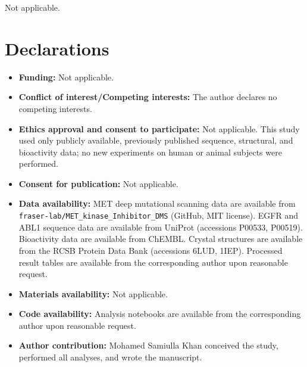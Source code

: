 \documentclass[pdflatex,sn-mathphys-num]{sn-jnl}%
\theoremstyle{thmstyleone}%
\theoremstyle{thmstyletwo}%
\theoremstyle{thmstylethree}%
\begin{document}
\backmatter

Not applicable.

\section*{Declarations}

\begin{itemize}
\item \textbf{Funding:} Not applicable.
\item \textbf{Conflict of interest/Competing interests:} The author declares no competing interests.
\item \textbf{Ethics approval and consent to participate:} Not applicable. This study used only publicly available, previously published sequence, structural, and bioactivity data; no new experiments on human or animal subjects were performed.
\item \textbf{Consent for publication:} Not applicable.
\item \textbf{Data availability:} MET deep mutational scanning data are available from \texttt{fraser-lab/\allowbreak MET\_\allowbreak kinase\_\allowbreak Inhibitor\_\allowbreak DMS} (GitHub, MIT license). EGFR and ABL1 sequence data are available from UniProt (accessions P00533, P00519). Bioactivity data are available from ChEMBL. Crystal structures are available from the RCSB Protein Data Bank (accessions 6LUD, 1IEP). Processed result tables are available from the corresponding author upon reasonable request.
\item \textbf{Materials availability:} Not applicable.
\item \textbf{Code availability:} Analysis notebooks are available from the corresponding author upon reasonable request.
\item \textbf{Author contribution:} Mohamed Samiulla Khan conceived the study, performed all analyses, and wrote the manuscript.
\end{itemize}

%
\end{document}
